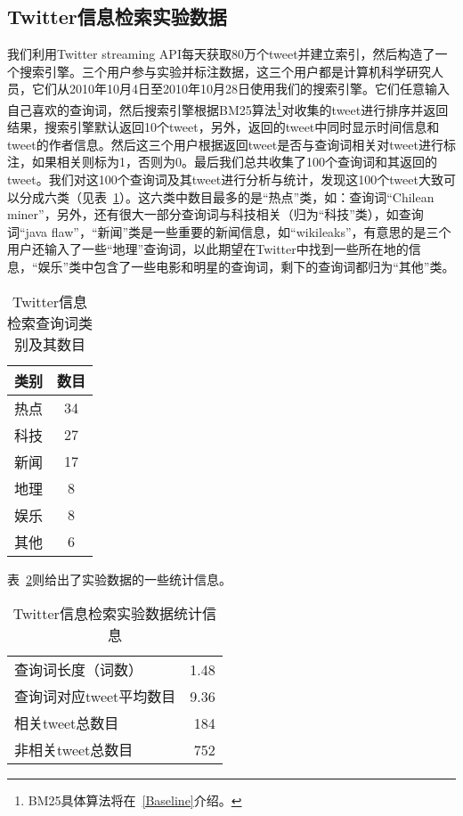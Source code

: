  \subsection{Twitter信息检索实验数据}
 我们利用Twitter streaming API每天获取80万个tweet并建立索引，然后构造了一个搜索引擎。三个用户参与实验并标注数据，这三个用户都是计算机科学研究人员，它们从2010年10月4日至2010年10月28日使用我们的搜索引擎。它们任意输入自己喜欢的查询词，然后搜索引擎根据BM25算法\footnote{BM25具体算法将在~\ref{Baseline}介绍。}对收集的tweet进行排序并返回结果，搜索引擎默认返回10个tweet，另外，返回的tweet中同时显示时间信息和tweet的作者信息。然后这三个用户根据返回tweet是否与查询词相关对tweet进行标注，如果相关则标为1，否则为0。最后我们总共收集了100个查询词和其返回的tweet。我们对这100个查询词及其tweet进行分析与统计，发现这100个tweet大致可以分成六类（见表~\ref{Data_aaai_cata}）。这六类中数目最多的是“热点”类，如：查询词“Chilean miner”，另外，还有很大一部分查询词与科技相关（归为“科技”类），如查询词“java flaw”，“新闻”类是一些重要的新闻信息，如“wikileaks”，有意思的是三个用户还输入了一些“地理”查询词，以此期望在Twitter中找到一些所在地的信息，“娱乐”类中包含了一些电影和明星的查询词，剩下的查询词都归为“其他”类。

 \begin{table}[htp]
\centering
\caption{Twitter信息检索查询词类别及其数目}
\label{Data_aaai_cata}
 \begin{tabular}{|l |c|}
 \hline
\textbf{类别}& \textbf{数目 }\\ 
 \hline
 热点 & 34 \\ 
科技 & 27 \\
新闻 & 17 \\
地理 & 8 \\
娱乐 & 8 \\
其他 & 6 \\
 \hline
\end{tabular}
\end{table}

表~\ref{Data_aaai_stat}则给出了实验数据的一些统计信息。

 \begin{table}[htp]
\centering
\caption{Twitter信息检索实验数据统计信息}
\label{Data_aaai_stat}
 \begin{tabular}{|l r|}
 \hline
查询词长度（词数）& 1.48 \\
查询词对应tweet平均数目 & 9.36 \\
相关tweet总数目 & 184 \\
非相关tweet总数目 & 752 \\
 \hline
\end{tabular}
\end{table}

